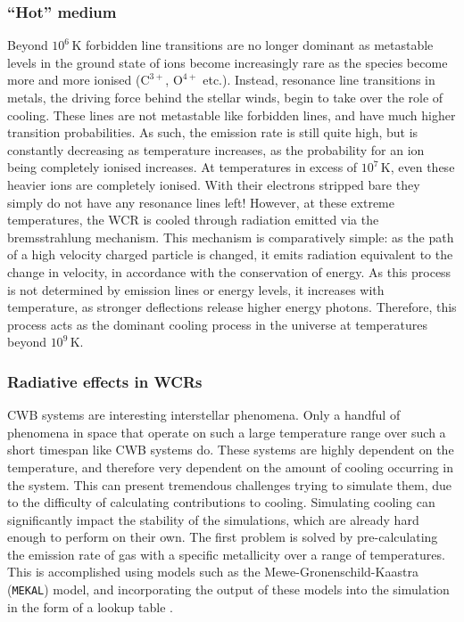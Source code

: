 \subsubsection{``Hot'' medium}

Beyond $10^6\,\si{\kelvin}$ forbidden line transitions are no longer dominant as metastable levels in the ground state of ions become increasingly rare as the species become more and more ionised ($\text{C}^{3+}$, $\text{O}^{4+}$ etc.).
Instead, resonance line transitions in metals, the driving force behind the stellar winds, begin to take over the role of cooling.
These lines are not metastable like forbidden lines, and have much higher transition probabilities.
As such, the emission rate is still quite high, but is constantly decreasing as temperature increases, as the probability for an ion being completely ionised increases.
At temperatures in excess of $10^7\,\si{\kelvin}$, even these heavier ions are completely ionised.
With their electrons stripped bare they simply do not have any resonance lines left!
However, at these extreme temperatures, the WCR is cooled through radiation emitted via the bremsstrahlung mechanism.
This mechanism is comparatively simple: as the path of a high velocity charged particle is changed, it emits radiation equivalent to the change in velocity, in accordance with the conservation of energy.
As this process is not determined by emission lines or energy levels, it increases with temperature, as stronger deflections release higher energy photons.
Therefore, this process acts as the dominant cooling process in the universe at temperatures beyond $10^9 \, \si{\kelvin}$.

\subsubsection{Radiative effects in WCRs}

CWB systems are interesting interstellar phenomena.
Only a handful of phenomena in space that operate on such a large temperature range over such a short timespan like CWB systems do.
These systems are highly dependent on the temperature, and therefore very dependent on the amount of cooling occurring in the system.
This can present tremendous challenges trying to simulate them, due to the difficulty of calculating contributions to cooling.
Simulating cooling can significantly impact the stability of the simulations, which are already hard enough to perform on their own.
The first problem is solved by pre-calculating the emission rate of gas with a specific metallicity over a range of temperatures.
This is accomplished using models such as the Mewe-Gronenschild-Kaastra (\texttt{MEKAL}) model, and incorporating the output of these models into the simulation in the form of a lookup table
\parencite{meweCalculatedXradiationOptically1985,kaastraSPEXHighresolutionCosmic2013}.


